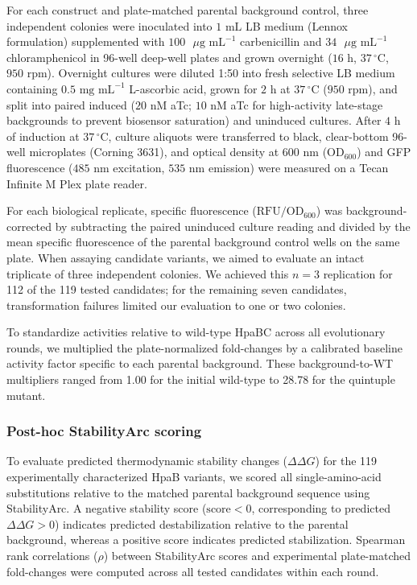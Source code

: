 \documentclass[sn-nature]{sn-jnl}
\begin{document}
    For each construct and plate-matched parental background control, three independent colonies were inoculated into $1\text{ mL}$ LB medium (Lennox formulation) supplemented with $100\text{ }\mu\text{g mL}^{-1}$ carbenicillin and $34\text{ }\mu\text{g mL}^{-1}$ chloramphenicol in 96-well deep-well plates and grown overnight ($16\text{ h}$, $37\,^{\circ}\text{C}$, $950\text{ rpm}$). Overnight cultures were diluted 1:50 into fresh selective LB medium containing $0.5\text{ mg mL}^{-1}$ L-ascorbic acid, grown for $2\text{ h}$ at $37\,^{\circ}\text{C}$ ($950\text{ rpm}$), and split into paired induced ($20\text{ nM}$ aTc; $10\text{ nM}$ aTc for high-activity late-stage backgrounds to prevent biosensor saturation) and uninduced cultures. After $4\text{ h}$ of induction at $37\,^{\circ}\text{C}$, culture aliquots were transferred to black, clear-bottom 96-well microplates (Corning 3631), and optical density at $600\text{ nm}$ ($\text{OD}_{600}$) and GFP fluorescence ($485\text{ nm}$ excitation, $535\text{ nm}$ emission) were measured on a Tecan Infinite M Plex plate reader.

    For each biological replicate, specific fluorescence ($\text{RFU}/\text{OD}_{600}$) was background-corrected by subtracting the paired uninduced culture reading and divided by the mean specific fluorescence of the parental background control wells on the same plate. When assaying candidate variants, we aimed to evaluate an intact triplicate of three independent colonies. We achieved this $n=3$ replication for 112 of the 119 tested candidates; for the remaining seven candidates, transformation failures limited our evaluation to one or two colonies. 
    
    To standardize activities relative to wild-type HpaBC across all evolutionary rounds, we multiplied the plate-normalized fold-changes by a calibrated baseline activity factor specific to each parental background. These background-to-WT multipliers ranged from 1.00 for the initial wild-type to 28.78 for the quintuple mutant.

    \subsubsection{Post-hoc StabilityArc scoring}
    To evaluate predicted thermodynamic stability changes ($\Delta\Delta G$) for the 119 experimentally characterized HpaB variants, we scored all single-amino-acid substitutions relative to the matched parental background sequence using StabilityArc. A negative stability score ($\text{score} < 0$, corresponding to predicted $\Delta\Delta G > 0$) indicates predicted destabilization relative to the parental background, whereas a positive score indicates predicted stabilization. Spearman rank correlations ($\rho$) between StabilityArc scores and experimental plate-matched fold-changes were computed across all tested candidates within each round.
    
\end{document}
